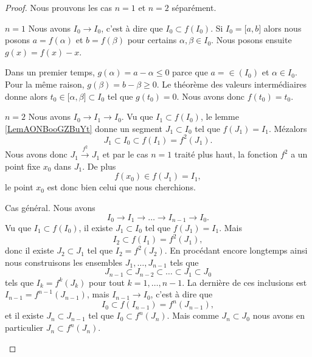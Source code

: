 \begin{proof}
    Nous prouvons les cas \( n=1\) et \( n=2\) séparément.
    \begin{subproof}
    \item[\( n=1\)]
        Nous avons \( I_0\to I_0\), c'est à dire que $I_0\subset f(I_0)$. Si \( I_0=\mathopen[ a , b \mathclose]\) alors nous posons \( a=f(\alpha)\) et \( b=f(\beta)\) pour certains \( \alpha,\beta\in I_0\). Nous posons ensuite \( g(x)=f(x)-x\).

        Dans un premier temps, \( g(\alpha)=a-\alpha\leq 0\) parce que \( a=\in(I_0)\) et \( \alpha\in I_0\). Pour la même raison, \( g(\beta)=b-\beta\geq 0\). Le théorème des valeurs intermédiaires donne alors \( t_0\in \mathopen[ \alpha , \beta \mathclose]\subset I_0\) tel que \( g(t_0)=0\). Nous avons donc \( f(t_0)=t_0\).
    \item[\( n=2\)]
        Nous avons \( I_0\to I_1\to I_0\). Vu que \( I_1\subset f(I_0)\), le lemme \ref{LemAONBooGZBuYt} donne un segment \( J_1\subset I_0\) tel que \( f(J_1)=I_1\). Mézalors
        \begin{equation}
            J_1\subset I_0\subset f(I_1)=f^2(J_1).
        \end{equation}
        Nous avons donc \( J_1\stackrel{f^2}{\longrightarrow}J_1\) et par le cas \( n=1\) traité plus haut, la fonction \( f^2 \) a un point fixe \( x_0\) dans \( J_1\). De plus
        \begin{equation}
            f(x_0)\in f(J_1)=I_1,
        \end{equation}
        le point \( x_0\) est donc bien celui que nous cherchions.
    \item
        Cas général. Nous avons
        \begin{equation}
            I_0\to I_1\to\ldots\to I_{n-1}\to I_0.
        \end{equation}
        Vu que \( I_1\subset f(I_0)\), il existe \( J_1\subset I_0\) tel que \( f(J_1)=I_1\). Mais
        \begin{equation}
            I_2\subset f(I_1)=f^2(J_1),
        \end{equation}
        donc il existe \( J_2\subset J_1\) tel que \( I_2=f^2(J_2)\). En procédant encore longtemps ainsi nous construisons les ensembles \( J_1,\ldots, J_{n-1}\) tels que
        \begin{equation}
            J_{n-1}\subset J_{n-2}\subset\ldots\subset J_1\subset J_0
        \end{equation}
        tels que \( I_k=f^k(J_k)\) pour tout \( k=1,\ldots, n-1\). La dernière de ces inclusions est \( I_{n-1}=f^{n-1}(J_{n-1})\), mais \( I_{n-1}\to I_0\), c'est à dire que
        \begin{equation}
            I_0\subset f(I_{n-1})=f^n(J_{n-1}),
        \end{equation}
        et il existe \( J_n\subset J_{n-1}\) tel que \( I_0\subset f^n(J_n)\). Mais comme \( J_n\subset J_0\) nous avons en particulier \( J_n\subset f^n(J_n)\).


\end{subproof}
\end{proof}
